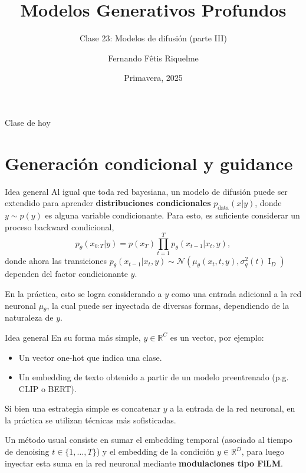 \documentclass{beamer}
\title{Modelos Generativos Profundos}
\subtitle{Clase 23: Modelos de difusión (parte III)}
\author{Fernando Fêtis Riquelme}
\institute{
    Facultad de Ciencias Físicas y Matemáticas\\
    Universidad de Chile
}
\date{Primavera, 2025}
\newcommand{\R}{\mathbb{R}}
\begin{document}
\begin{frame}
    \titlepage
\end{frame}

\begin{frame}{Clase de hoy}
    \tableofcontents
\end{frame}

\section{Generación condicional y guidance}

\begin{frame}{Idea general}
    Al igual que toda red bayesiana, un modelo de difusión puede ser extendido para aprender \textbf{distribuciones condicionales} $p_\text{data}(x|y)$, donde $y\sim p(y)$ es alguna variable condicionante. Para esto, es suficiente considerar un proceso backward condicional,
    \begin{equation*}
        p_\theta(x_{0:T}|y)=p(x_T)\prod_{t=1}^T p_\theta(x_{t-1}|x_t,y),
    \end{equation*}
    donde ahora las transiciones $p_\theta(x_{t-1}|x_t, y)\sim\mathcal{N}\left(\mu_\theta(x_t,t, y),\sigma_q^2(t)\operatorname{I}_D\right)$ dependen del factor condicionante $y$.

    En la práctica, esto se logra considerando a $y$ como una entrada adicional a la red neuronal $\mu_\theta$, la cual puede ser inyectada de diversas formas, dependiendo de la naturaleza de $y$.
\end{frame}

\begin{frame}{Idea general}
    En su forma más simple, $y\in\R^C$ es un vector, por ejemplo:
    \begin{itemize}
        \item Un vector one-hot que indica una clase.
        \item Un embedding de texto obtenido a partir de un modelo preentrenado (p.g. CLIP o BERT).
    \end{itemize}
    Si bien una estrategia simple es concatenar $y$ a la entrada de la red neuronal, en la práctica se utilizan técnicas más sofisticadas.

    Un método usual consiste en sumar el embedding temporal (asociado al tiempo de denoising $t\in\{1,\ldots,T\}$) y el embedding de la condición $y\in\R^D$, para luego inyectar esta suma en la red neuronal mediante \textbf{modulaciones tipo FiLM}.
\end{frame}
\end{document}
